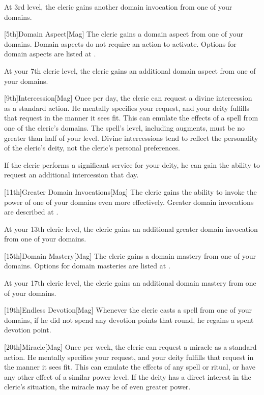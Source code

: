        At 3rd level, the cleric gains another domain invocation from one of your domains.

        [5th]{Domain Aspect}[Mag]
        The cleric gains a domain aspect from one of your domains.
        Domain aspects do not require an action to activate.
        Options for domain aspects are listed at .

        At your 7th cleric level, the cleric gains an additional domain aspect from one of your domains.

        [9th]{Intercession}[Mag]
        Once per day, the cleric can request a divine intercession as a standard action.
        He mentally specifies your request, and your deity fulfills that request in the manner it sees fit.
        This can emulate the effects of a spell from one of the cleric's domains.
        The spell's level, including augments, must be no greater than half of your level.
        Divine intercessions tend to reflect the personality of the cleric's deity, not the cleric's personal preferences.

        If the cleric performs a significant service for your deity, he can gain the ability to request an additional intercession that day.

        [11th]{Greater Domain Invocations}[Mag]
        The cleric gains the ability to invoke the power of one of your domains even more effectively.
        Greater domain invocations are described at .

        At your 13th cleric level, the cleric gains an additional greater domain invocation from one of your domains.

        [15th]{Domain Mastery}[Mag]
        The cleric gains a domain mastery from one of your domains.
        Options for domain masteries are listed at .

        At your 17th cleric level, the cleric gains an additional domain mastery from one of your domains.

        [19th]{Endless Devotion}[Mag]
        Whenever the cleric casts a spell from one of your domains, if he did not spend any devotion points that round, he regains a spent devotion point.

        [20th]{Miracle}[Mag]
        Once per week, the cleric can request a miracle as a standard action.
        He mentally specifies your request, and your deity fulfills that request in the manner it sees fit.
        This can emulate the effects of any spell or ritual, or have any other effect of a similar power level.
        If the deity has a direct interest in the cleric's situation, the miracle may be of even greater power.

